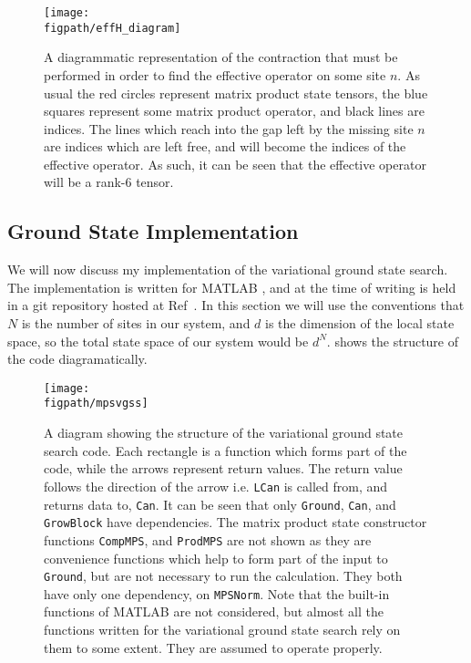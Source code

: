 \begin{figure}[ht!]
\centering
\texttt{[image: \\figpath/effH\_diagram]}
\caption{A diagrammatic representation of the contraction that must be performed in order to find the effective operator on some site \(n\). As usual the red circles represent matrix product state tensors, the blue squares represent some matrix product operator, and black lines are indices. The lines which reach into the gap left by the missing site \(n\) are indices which are left free, and will become the indices of the effective operator. As such, it can be seen that the effective operator will be a rank-6 tensor.}
\label{fig:vs1-3}
\end{figure}

\FloatBarrier
 \subsection{Ground State Implementation}
 
 We will now discuss my implementation of the variational ground state search. The implementation is written for MATLAB \cite{MATLAB}, and at the time of writing is held in a git repository hosted at Ref~\cite{otb:gitVGSS}. In this section we will use the conventions that \(N\) is the number of sites in our system, and \(d\) is the dimension of the local state space, so the total state space of our system would be \(d^{N}\).  shows the structure of the code diagramatically.
 
 \begin{figure}[ht!]
 \centering
 \texttt{[image: \\figpath/mpsvgss]}
 \caption{A diagram showing the structure of the variational ground state search code. Each rectangle is a function which forms part of the code, while the arrows represent return values. The return value follows the direction of the arrow i.e. \lstinline$LCan$ is called from, and returns data to, \lstinline$Can$. It can be seen that only \lstinline$Ground$, \lstinline$Can$, and \lstinline$GrowBlock$ have dependencies. The matrix product state constructor functions \lstinline$CompMPS$, and \lstinline$ProdMPS$ are not shown as they are convenience functions which help to form part of the input to \lstinline$Ground$, but are not necessary to run the calculation. They both have only one dependency, on \lstinline$MPSNorm$. Note that the built-in functions of MATLAB \cite{MATLAB} are not considered, but almost all the functions written for the variational ground state search rely on them to some extent. They are assumed to operate properly.}
 \label{fig:vs2-1}
 \end{figure}
 
